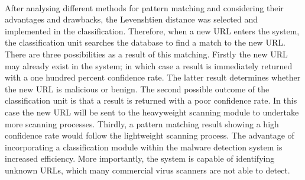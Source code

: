 \paragraph{} 
After analysing different methods for pattern matching and considering their advantages and drawbacks, the Levenshtien distance was selected and implemented in the classification.  Therefore, when a new URL enters the system, the classification unit searches the database to find a match to the new URL. There are three possibilities as a result of this matching. Firstly the new URL may already exist in the system; in which case a result is immediately returned with a one hundred percent confidence rate. The latter result determines whether the new URL is malicious or benign. The second possible outcome of the classification unit is that a result is returned with a poor confidence rate. In this case the new URL will be sent to the heavyweight scanning module to undertake more scanning processes. Thirdly, a pattern matching result showing a high confidence rate would follow the lightweight scanning process.
The advantage of incorporating a classification module within the malware detection system is increased efficiency. More importantly, the system is capable of identifying unknown URLs, which many commercial virus scanners are not able to detect. 
